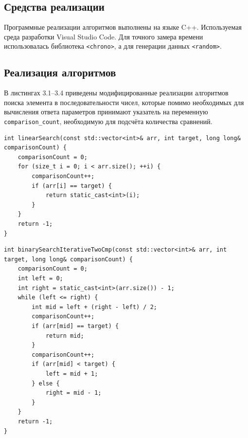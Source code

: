 \documentclass[14pt,a4paper]{extarticle}
\begin{document}
\subsection{Средства реализации}
Программные реализации алгоритмов выполнены на языке C++. Используемая среда разработки Visual Studio Code. Для точного замера времени использовалась библиотека \texttt{<chrono>}, а для генерации данных \texttt{<random>}.

\subsection{Реализация алгоритмов}
В листингах 3.1--3.4 приведены модифицированные реализации алгоритмов поиска элемента в последовательности чисел, которые помимо необходимых для вычисления ответа параметров принимают указатель на переменную \texttt{comparison\_count}, необходимую для подсчёта количества сравнений.

\noindent\begin{minipage}{\linewidth}
\begin{lstlisting}[caption={Реализация алгоритма полного перебора},label={lst:linear}]
int linearSearch(const std::vector<int>& arr, int target, long long& comparisonCount) {
    comparisonCount = 0;
    for (size_t i = 0; i < arr.size(); ++i) {
        comparisonCount++;
        if (arr[i] == target) {
            return static_cast<int>(i);
        }
    }
    return -1;
}
\end{lstlisting}
\end{minipage}

\medskip
\noindent\begin{minipage}{\linewidth}
\begin{lstlisting}[caption={Реализация нерекурсивного алгоритма бинарного поиска с двумя сравнениями},label={lst:two}]
int binarySearchIterativeTwoCmp(const std::vector<int>& arr, int target, long long& comparisonCount) {
    comparisonCount = 0;
    int left = 0;
    int right = static_cast<int>(arr.size()) - 1;
    while (left <= right) {
        int mid = left + (right - left) / 2;
        comparisonCount++;
        if (arr[mid] == target) {
            return mid;
        }
        comparisonCount++;
        if (arr[mid] < target) {
            left = mid + 1;
        } else {
            right = mid - 1;
        }
    }
    return -1;
}
\end{lstlisting}
\end{minipage}
\end{document}
